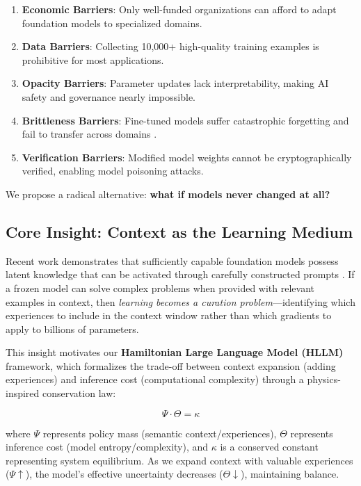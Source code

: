 \documentclass[11pt,a4paper]{article}
\begin{document}
\begin{enumerate}
    \item \textbf{Economic Barriers}: Only well-funded organizations can afford to adapt foundation models to specialized domains.
    \item \textbf{Data Barriers}: Collecting 10,000+ high-quality training examples is prohibitive for most applications.
    \item \textbf{Opacity Barriers}: Parameter updates lack interpretability, making AI safety and governance nearly impossible.
    \item \textbf{Brittleness Barriers}: Fine-tuned models suffer catastrophic forgetting and fail to transfer across domains \cite{kirkpatrick2017overcoming}.
    \item \textbf{Verification Barriers}: Modified model weights cannot be cryptographically verified, enabling model poisoning attacks.
\end{enumerate}

We propose a radical alternative: \textbf{what if models never changed at all?}

\subsection{Core Insight: Context as the Learning Medium}

Recent work demonstrates that sufficiently capable foundation models possess latent knowledge that can be activated through carefully constructed prompts \cite{wei2022chain,yao2023tree,brown2020language}. If a frozen model can solve complex problems when provided with relevant examples in context, then \textit{learning becomes a curation problem}—identifying which experiences to include in the context window rather than which gradients to apply to billions of parameters.

This insight motivates our \textbf{Hamiltonian Large Language Model (HLLM)} framework, which formalizes the trade-off between context expansion (adding experiences) and inference cost (computational complexity) through a physics-inspired conservation law:

\begin{equation}
\Psi \cdot \Theta = \kappa
\label{eq:hamiltonian}
\end{equation}

where $\Psi$ represents policy mass (semantic context/experiences), $\Theta$ represents inference cost (model entropy/complexity), and $\kappa$ is a conserved constant representing system equilibrium. As we expand context with valuable experiences ($\Psi \uparrow$), the model's effective uncertainty decreases ($\Theta \downarrow$), maintaining balance.
\end{document}
